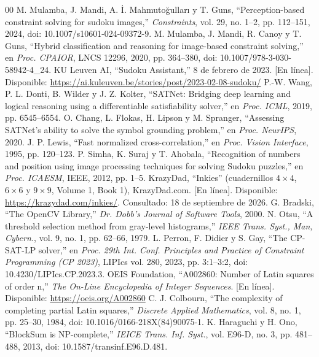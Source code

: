 \documentclass[conference]{IEEEtran}
\begin{document}
\begin{thebibliography}{00}
 M. Mulamba, J. Mandi, A. İ. Mahmutoğulları y T. Guns, ``Perception-based constraint solving for sudoku images,'' \textit{Constraints}, vol. 29, no. 1--2, pp. 112--151, 2024, doi: 10.1007/s10601-024-09372-9.
 M. Mulamba, J. Mandi, R. Canoy y T. Guns, ``Hybrid classification and reasoning for image-based constraint solving,'' en \textit{Proc. CPAIOR}, LNCS 12296, 2020, pp. 364--380, doi: 10.1007/978-3-030-58942-4\_24.
 KU Leuven AI, ``Sudoku Assistant,'' 8 de febrero de 2023. [En línea]. Disponible: \url{https://ai.kuleuven.be/stories/post/2023-02-08-sudoku/}
 P.-W. Wang, P. L. Donti, B. Wilder y J. Z. Kolter, ``SATNet: Bridging deep learning and logical reasoning using a differentiable satisfiability solver,'' en \textit{Proc. ICML}, 2019, pp. 6545--6554.
 O. Chang, L. Flokas, H. Lipson y M. Spranger, ``Assessing SATNet's ability to solve the symbol grounding problem,'' en \textit{Proc. NeurIPS}, 2020.
 J. P. Lewis, ``Fast normalized cross-correlation,'' en \textit{Proc. Vision Interface}, 1995, pp. 120--123.
 P. Simha, K. Suraj y T. Ahobala, ``Recognition of numbers and position using image processing techniques for solving Sudoku puzzles,'' en \textit{Proc. ICAESM}, IEEE, 2012, pp. 1--5.
 KrazyDad, ``Inkies'' (cuadernillos $4 \times 4$, $6 \times 6$ y $9 \times 9$, Volume 1, Book 1), KrazyDad.com. [En línea]. Disponible: \url{https://krazydad.com/inkies/}. Consultado: 18 de septiembre de 2026.
 G. Bradski, ``The OpenCV Library,'' \textit{Dr. Dobb's Journal of Software Tools}, 2000.
 N. Otsu, ``A threshold selection method from gray-level histograms,'' \textit{IEEE Trans. Syst., Man, Cybern.}, vol. 9, no. 1, pp. 62--66, 1979.
 L. Perron, F. Didier y S. Gay, ``The CP-SAT-LP solver,'' en \textit{Proc. 29th Int. Conf. Principles and Practice of Constraint Programming (CP 2023)}, LIPIcs vol. 280, 2023, pp. 3:1--3:2, doi: 10.4230/LIPIcs.CP.2023.3.
 OEIS Foundation, ``A002860: Number of Latin squares of order n,'' \textit{The On-Line Encyclopedia of Integer Sequences}. [En línea]. Disponible: \url{https://oeis.org/A002860}
 C. J. Colbourn, ``The complexity of completing partial Latin squares,'' \textit{Discrete Applied Mathematics}, vol. 8, no. 1, pp. 25--30, 1984, doi: 10.1016/0166-218X(84)90075-1.
 K. Haraguchi y H. Ono, ``BlockSum is NP-complete,'' \textit{IEICE Trans. Inf. Syst.}, vol. E96-D, no. 3, pp. 481--488, 2013, doi: 10.1587/transinf.E96.D.481.

\end{thebibliography}
\end{document}
